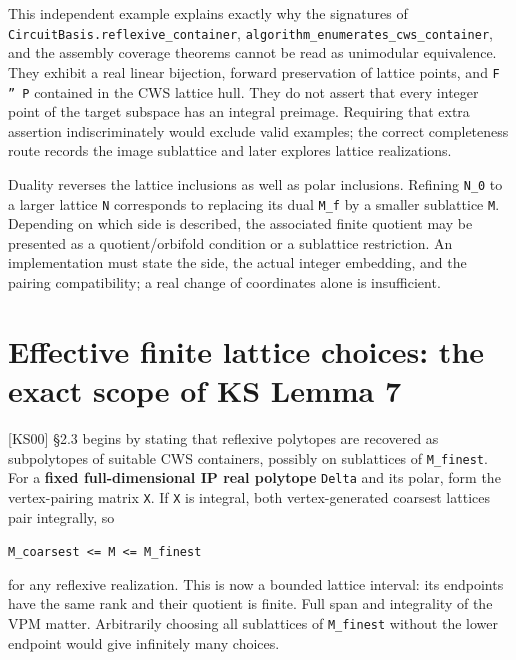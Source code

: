 \documentclass[11pt,a4paper,oneside]{report}
\begin{document}
This independent example explains exactly why the signatures of
\texttt{CircuitB\allowbreak{}asis.\allowbreak{}reflexiv\allowbreak{}e\_\allowbreak{}containe\allowbreak{}r},
\texttt{algorith\allowbreak{}m\_\allowbreak{}enumerat\allowbreak{}es\_\allowbreak{}cws\_\allowbreak{}containe\allowbreak{}r},
and the assembly coverage theorems cannot be read as unimodular
equivalence. They exhibit a real linear bijection, forward preservation
of lattice points, and \texttt{F '' P} contained in the CWS lattice
hull. They do not assert that every integer point of the target subspace
has an integral preimage. Requiring that extra assertion
indiscriminately would exclude valid examples; the correct completeness
route records the image sublattice and later explores lattice
realizations.

Duality reverses the lattice inclusions as well as polar inclusions.
Refining \texttt{N\_\allowbreak{}0} to a larger lattice \texttt{N}
corresponds to replacing its dual \texttt{M\_\allowbreak{}f} by a
smaller sublattice \texttt{M}. Depending on which side is described, the
associated finite quotient may be presented as a quotient/orbifold
condition or a sublattice restriction. An implementation must state the
side, the actual integer embedding, and the pairing compatibility; a
real change of coordinates alone is insufficient.

\section{Effective finite lattice choices: the exact scope of KS Lemma
7}\label{cws-and-lattice-realizations--effective-finite-lattice-choices-the-exact-scope-of-ks-lemma-7}

{[}KS00{]} §2.3 begins by stating that reflexive polytopes are recovered
as subpolytopes of suitable CWS containers, possibly on sublattices of
\texttt{M\_\allowbreak{}finest}. For a \textbf{fixed full-dimensional IP
real polytope} \texttt{Delta} and its polar, form the vertex-pairing
matrix \texttt{X}. If \texttt{X} is integral, both vertex-generated
coarsest lattices pair integrally, so

\texttt{M\_\allowbreak{}coarsest\allowbreak{} <=\allowbreak{} M <=\allowbreak{} M\_\allowbreak{}finest}

for any reflexive realization. This is now a bounded lattice interval:
its endpoints have the same rank and their quotient is finite. Full span
and integrality of the VPM matter. Arbitrarily choosing all sublattices
of \texttt{M\_\allowbreak{}finest} without the lower endpoint would give
infinitely many choices.
\end{document}
